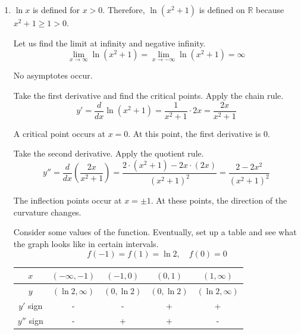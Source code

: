 \documentclass[a4paper, 12pt]{article}
\begin{document}
\begin{enumerate}[leftmargin=*,label=\textbf{\arabic*.}]
\item $\ln x$ is defined for $x>0$. Therefore, $\ln\left(x^2+1\right)$ is defined on $\mathbb{R}$ because $x^2+1\geq1>0$.

Let us find the limit at infinity and negative infinity.
\begin{equation*}\lim_{x\to\infty}\ln\left(x^2+1\right)=\lim_{x\to-\infty}\ln\left(x^2+1\right)=\infty\end{equation*}

No asymptotes occur.

Take the first derivative and find the critical points. Apply the chain rule.
\[y'=\frac d{dx}\ln\left(x^2+1\right)=\frac1{x^2+1}\cdot 2x=\frac{2x}{x^2+1}\]

A critical point occurs at $x=0$. At this point, the first derivative is $0$.

Take the second derivative. Apply the quotient rule.
\[y''=\frac d{dx}\left(\frac{2x}{x^2+1}\right)=\frac{2\cdot\left(x^2+1\right)-2x\cdot(2x)}{\left(x^2+1\right)^2}=\frac{2-2x^2}{\left(x^2+1\right)^2}\]

The inflection points occur at $x=\pm1$. At these points, the direction of the curvature changes.

Consider some values of the function. Eventually, set up a table and see what the graph looks like in certain intervals.
\begin{equation*}\,f\left(-1\right)=f\left(1\right)=\ln2,\quad f(0)=0\end{equation*}
\begin{center}
    \begin{tabular}{|c|cccc|} 
    \hline
        $x$&$\left(-\infty,-1\right)$&$\left(-1,0\right)$&$\left(0,1\right)$&$\left(1, \infty\right)$\\
        \hline
        $y$&$(\ln2,\infty)$&$(0,\ln2)$&$(0,\ln2)$&$(\ln2,\infty)$\\
        \hline
        $y'$ sign&-&-&+&+\\
        \hline
        $y''$ sign&-&+&+&-\\
        \hline
    \end{tabular}
\end{center}

\begin{center}
\end{center}


\end{enumerate}
\end{document}

